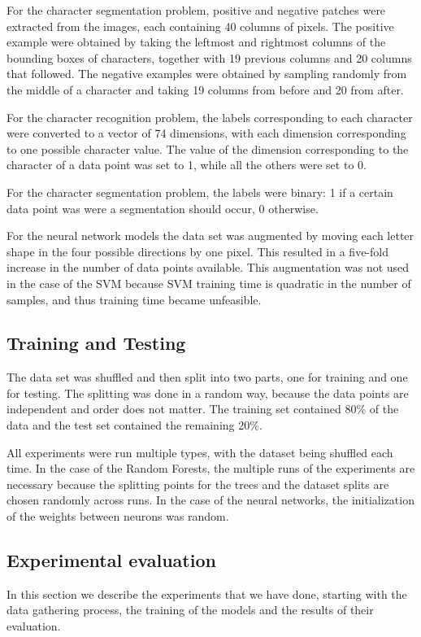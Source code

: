 For the character segmentation problem, positive and negative patches were extracted from the images, each containing 40 columns of pixels. The positive example were obtained by taking the leftmost and rightmost columns of the bounding boxes of characters, together with 19 previous columns and 20 columns that followed. The negative examples were obtained by sampling randomly from the middle of a character and taking 19 columns from before and 20 from after.

For the character recognition problem, the labels corresponding to each character were converted to a vector of 74 dimensions, with each dimension corresponding to one possible character value. The value of the dimension corresponding to the character of a data point was set to 1, while all the others were set to 0. 

For the character segmentation problem, the labels were binary: 1 if a certain data point was were a segmentation should occur, 0 otherwise. 

For the neural network models the data set was augmented by moving each letter shape in the four possible directions by one pixel. This resulted in a five-fold increase in the number of data points available. This augmentation was not used in the case of the SVM because SVM training time is quadratic in the number of samples, and thus training time became unfeasible. 

\subsection{Training and Testing}
The data set was shuffled and then split into two parts, one for training and one for testing. The splitting was done in a random way, because the data points are independent and order does not matter. The training set contained 80\% of the data and the test set contained the remaining 20\%. 

All experiments were run multiple types, with the dataset being shuffled each time. In the case of the Random Forests, the multiple runs of the experiments are necessary because the splitting points for the trees and the dataset splits are chosen randomly across runs. In the case of the neural networks, the initialization of the weights between neurons was random. 
\subsection{Experimental evaluation}
\label{sec:recog}
In this section we describe the experiments that we have done, starting with the data gathering process, the training of the models and the results of their evaluation.

